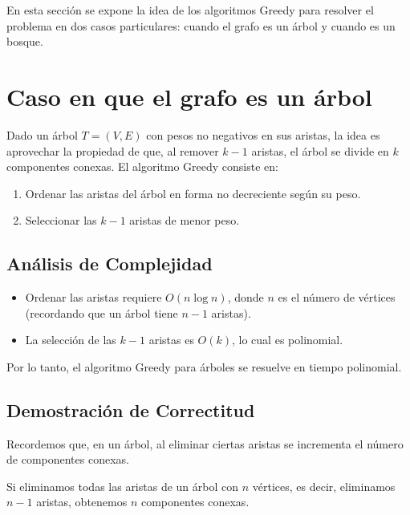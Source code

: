 \maketitle

En esta sección se expone la idea de los algoritmos Greedy para resolver el problema en dos casos particulares: cuando el grafo es un árbol y cuando es un bosque.

\section{Caso en que el grafo es un árbol}

Dado un árbol \( T = (V,E) \) con pesos no negativos en sus aristas, la idea es aprovechar la propiedad de que, al remover \( k-1 \) aristas, el árbol se divide en \( k \) componentes conexas. El algoritmo Greedy consiste en:
\begin{enumerate}
    \item Ordenar las aristas del árbol en forma no decreciente según su peso.
    \item Seleccionar las \( k-1 \) aristas de menor peso.
\end{enumerate}

\subsection{Análisis de Complejidad}
\begin{itemize}
    \item Ordenar las aristas requiere \( O(n \log n) \), donde \( n \) es el número de vértices (recordando que un árbol tiene \( n-1 \) aristas).
    \item La selección de las \( k-1 \) aristas es \( O(k) \), lo cual es polinomial.
\end{itemize}
Por lo tanto, el algoritmo Greedy para árboles se resuelve en tiempo polinomial.

\subsection{Demostración de Correctitud}

Recordemos que, en un árbol, al eliminar ciertas aristas se incrementa el número de componentes conexas.

\begin{lemma}
Si eliminamos todas las aristas de un árbol con \( n \) vértices, es decir, eliminamos \( n-1 \) aristas, obtenemos \( n \) componentes conexas.
\end{lemma}

